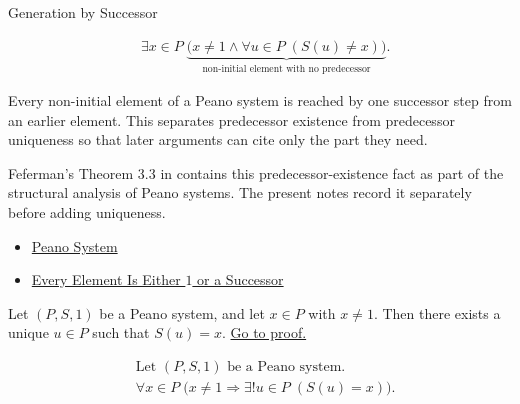 \begin{topicbox}{Generation by Successor}
\begin{remark*}
\[
\begin{aligned}
&\exists x \in P\;
\underbrace{\bigl(x\neq 1 \land
\forall u \in P\;(S(u)\neq x)\bigr)}_{\text{non-initial element with no predecessor}}.
\end{aligned}
\]
\end{remark*}

\begin{remark*}[Interpretation]
Every non-initial element of a Peano system is reached by one successor step
from an earlier element. This separates predecessor existence from predecessor
uniqueness so that later arguments can cite only the part they need.
\end{remark*}

\begin{remark*}
Feferman's Theorem 3.3 in \citet{FefermanNumberSystems1964} contains this
predecessor-existence fact as part of the structural analysis of Peano systems.
The present notes record it separately before adding uniqueness.
\end{remark*}

\begin{remark*}[Dependencies]
\begin{itemize}
  \item \hyperref[def:peano-system]{Peano System}
  \item \hyperref[thm:every-element-is-one-or-a-successor]{Every Element Is Either $1$ or a Successor}
\end{itemize}
\end{remark*}

\begin{tcolorbox}[colback=corbox, colframe=corborder, arc=2pt,
  left=6pt, right=6pt, top=4pt, bottom=4pt,
  title={\small\textbf{Corollary (Predecessor Existence and Uniqueness Away from \texorpdfstring{$1$}{1})}} ,
  fonttitle=\small\bfseries]
\begin{corollary}
\label{cor:predecessor-exists-unique-away-from-one}
Let $(P,S,1)$ be a Peano system, and let $x \in P$ with $x \neq 1$. Then
there exists a unique $u \in P$ such that $S(u)=x$.
\hyperref[prf:predecessor-exists-unique-away-from-one]{Go to proof.}
\end{corollary}
\end{tcolorbox}

\begin{remark*}
\[
\begin{aligned}
&\text{Let } (P,S,1) \text{ be a Peano system.}\\
&\forall x \in P\;\bigl(x \neq 1 \Longrightarrow \exists! u \in P\;(S(u)=x)\bigr).
\end{aligned}
\]
\end{remark*}


\end{topicbox}
